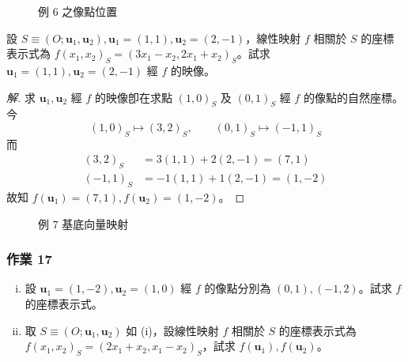 \begin{figure}[H]
\centering
{}
\caption{例 6 之像點位置}
\label{fig:b4s-1-3-7}
\end{figure}

\begin{example}[例 7]
設 $S \equiv (O; \mathbf{u}_1, \mathbf{u}_2), \mathbf{u}_1 = (1, 1), \mathbf{u}_2 = (2, -1)$，線性映射 $f$ 相關於 $S$ 的座標表示式為 $f(x_1, x_2)_S = (3x_1 - x_2, 2x_1 + x_2)_S$。試求 $\mathbf{u}_1 = (1, 1), \mathbf{u}_2 = (2, -1)$ 經 $f$ 的映像。
\end{example}

\begin{proof}[解]
求 $\mathbf{u}_1, \mathbf{u}_2$ 經 $f$ 的映像卽在求點 $(1, 0)_S$ 及 $(0, 1)_S$ 經 $f$ 的像點的自然座標。今
\[ (1, 0)_S \mapsto (3, 2)_S, \qquad (0, 1)_S \mapsto (-1, 1)_S \]
而
\begin{align*}
(3, 2)_S &= 3(1, 1) + 2(2, -1) = (7, 1) \\
(-1, 1)_S &= -1(1, 1) + 1(2, -1) = (1, -2)
\end{align*}
故知 $f(\mathbf{u}_1) = (7, 1), f(\mathbf{u}_2) = (1, -2)$。
\end{proof}

\begin{figure}[H]
\centering
{}
\caption{例 7 基底向量映射}
\label{fig:b4s-1-3-8}
\end{figure}

\subsubsection*{作業 17}
\begin{enumerate}[(i)]
  \item 設 $\mathbf{u}_1 = (1, -2), \mathbf{u}_2 = (1, 0)$ 經 $f$ 的像點分別為 $(0, 1), (-1, 2)$。試求 $f$ 的座標表示式。
  \item 取 $S \equiv (O; \mathbf{u}_1, \mathbf{u}_2)$ 如 (i)，設線性映射 $f$ 相關於 $S$ 的座標表示式為 $f(x_1, x_2)_S = (2x_1 + x_2, x_1 - x_2)_S$，試求 $f(\mathbf{u}_1), f(\mathbf{u}_2)$。
\end{enumerate}

